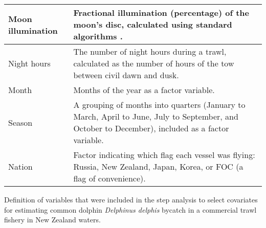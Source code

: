\documentclass[10pt]{article}
\begin{document}
\begin{table}[h]
\begin{tabular}{|p{}|p{}|}
Moon illumination & Fractional illumination (percentage) of the
moon's disc, calculated using standard algorithms
\cite{Meeus_astronomical_1991}. \\ 
\hline
Night hours & The number of night hours during a trawl, calculated as the number of
hours of the tow between civil dawn and dusk. \\ 
\hline
Month & Months of the year as a factor variable. \\ 
\hline
Season & A grouping of months into quarters (January to
March, April to June, July to September, and October to December),
included  as a factor variable.\\ 
\hline
Nation & Factor indicating which flag each vessel was flying: Russia, New Zealand, Japan, Korea, or FOC (a flag of convenience). \\
\hline
\end{tabular}

\begin{flushleft}
Definition of variables that were included in the step analysis to
select covariates for estimating common dolphin \emph{Delphinus delphis} bycatch 
in a commercial trawl fishery in New Zealand waters. 
\end{flushleft}
\label{tab:potential_covariates}
\end{table}
\end{document}
